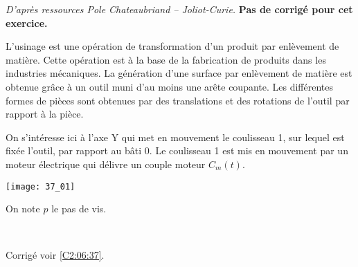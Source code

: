 \normaltrue \difficilefalse \tdifficilefalse
\correctionfalse


\textit{D'après ressources Pole Chateaubriand -- Joliot-Curie.}
\setcounter{question}{0}
\ifcorrection
\else
\textbf{Pas de corrigé pour cet exercice.}
\fi

\ifprof
\else
L’usinage est une opération de transformation d’un produit par enlèvement de matière.
Cette opération est à la base de la fabrication de produits dans les industries mécaniques.
La génération d’une surface par enlèvement de matière est obtenue grâce à un outil muni
d’au moins une arête coupante. Les différentes formes de pièces sont obtenues par des
translations et des rotations de l'outil par rapport à la pièce.


On s’intéresse ici à l’axe Y qui met en mouvement le coulisseau 1,
sur lequel est fixée l’outil, par rapport au bâti 0. Le coulisseau 1 est mis en mouvement par un moteur
électrique qui délivre un couple moteur $C_m(t)$.

\begin{center}
\texttt{[image: 37\_01]}
\end{center}

On note $p$ le pas de vis. 
\fi


\ifprof
\else
\fi

\ifprof ~\\
\else
\fi

\ifprof
\else
\begin{flushright}
\footnotesize{Corrigé  voir \ref{C2:06:37}.}
\end{flushright}%
\fi